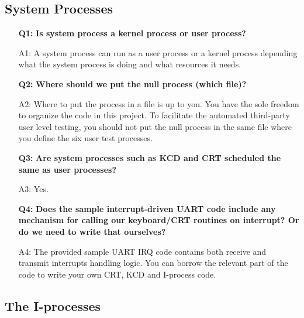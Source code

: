 \subsection{System Processes}
\begin{itemize}
\item[{\bf Q1:}] {\bf Is system process a kernel process or user process?} 
\item[A1:]
A system process can run as a user process or a kernel process depending what the system process is doing and what resources it needs. 

\item[{\bf Q2:}] {\bf Where should we put the null process (which file)?}
\item[A2:]
Where to put the process in a file is up to you. You have the sole freedom to organize the code in this project. To facilitate the automated third-party user level testing, you should not put the null process in the same file where you define the six user test processes.

\item[\bf Q3:] {\bf Are system processes such as KCD and CRT scheduled the same as user processes?}
\item[A3:] Yes.  

\item[{\bf Q4:}] {\bf Does the sample interrupt-driven UART code include any mechanism for calling our keyboard/CRT routines on interrupt? Or do we need to write that ourselves?}
\item[A4:] The provided sample UART IRQ code contains both receive and transmit interrupts handling logic. You can borrow the relevant part of the code to write your own CRT, KCD and I-process code.
\end{itemize}

\subsection{The I-processes}

